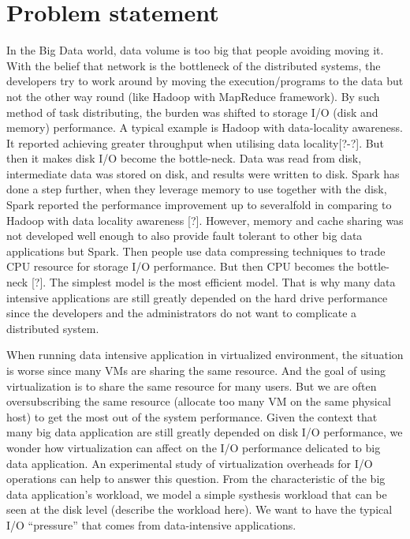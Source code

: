 \documentclass{acmsig}
\begin{document}
\section{Problem statement}

In the Big Data world, data volume is too big that people avoiding moving it. With the belief that network is the bottleneck of the distributed systems, the developers try to work around by moving the execution/programs to the data but not the other way round (like Hadoop with MapReduce framework). By such method of task distributing, the burden was shifted to storage I/O (disk and memory) performance. A typical example is Hadoop with data-locality awareness. It reported achieving greater throughput when utilising data locality[?-?]. But then it makes disk I/O become the bottle-neck. Data was read from disk, intermediate data was stored on disk, and results were written to disk. Spark has done a step further, when they leverage memory to use together with the disk, Spark reported the performance improvement up to severalfold in comparing to Hadoop with data locality awareness [?]. However, memory and cache sharing was not developed well enough to also provide fault tolerant to other big data applications but Spark. Then people use data compressing techniques to trade CPU resource for storage I/O performance. But then CPU becomes the bottle-neck [?]. The simplest model is the most efficient model. That is why many data intensive applications are still greatly depended on the hard drive performance since the developers and the administrators do not want to complicate a distributed system.

When running data intensive application in virtualized environment, the situation is worse since many VMs are sharing the same resource.
And the goal of using virtualization is to share the same resource for many users.  But we are often oversubscribing the same resource (allocate too many VM on the same physical host) to get the most out of the system performance. Given the context that many big data application are still greatly depended on disk I/O performance, we wonder how virtualization can affect on the I/O performance delicated to big data application. An experimental study of virtualization overheads for I/O operations can help to answer this question. From the characteristic of the big data application's workload, we model a simple systhesis workload that can be seen at the disk level (describe the workload here). We want to have the typical I/O ``pressure'' that comes from data-intensive applications.
\end{document}
